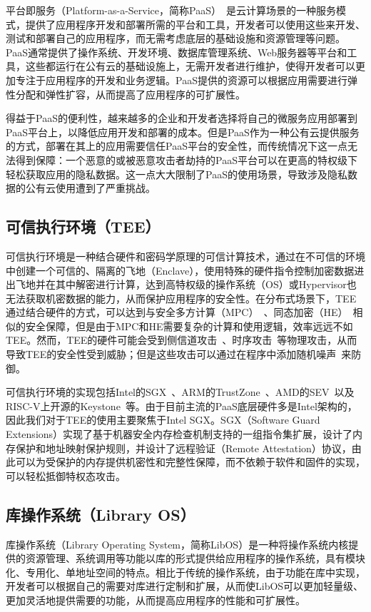 平台即服务（Platform-as-a-Service，简称PaaS）~\cite{}是云计算场景的一种服务模式，提供了应用程序开发和部署所需的平台和工具，开发者可以使用这些来开发、测试和部署自己的应用程序，而无需考虑底层的基础设施和资源管理等问题。PaaS通常提供了操作系统、开发环境、数据库管理系统、Web服务器等平台和工具，这些都运行在公有云的基础设施上，无需开发者进行维护，使得开发者可以更加专注于应用程序的开发和业务逻辑。PaaS提供的资源可以根据应用需要进行弹性分配和弹性扩容，从而提高了应用程序的可扩展性。

得益于PaaS的便利性，越来越多的企业和开发者选择将自己的微服务应用部署到PaaS平台上，以降低应用开发和部署的成本。但是PaaS作为一种公有云提供服务的方式，部署在其上的应用需要信任PaaS平台的安全性，而传统情况下这一点无法得到保障：一个恶意的或被恶意攻击者劫持的PaaS平台可以在更高的特权级下轻松获取应用的隐私数据。这一点大大限制了PaaS的使用场景，导致涉及隐私数据的公有云使用遭到了严重挑战。

\subsection{可信执行环境（TEE）}

可信执行环境是一种结合硬件和密码学原理的可信计算技术，通过在不可信的环境中创建一个可信的、隔离的飞地（Enclave），使用特殊的硬件指令控制加密数据进出飞地并在其中解密进行计算，达到高特权级的操作系统（OS）或Hypervisor也无法获取机密数据的能力，从而保护应用程序的安全性。在分布式场景下，TEE通过结合硬件的方式，可以达到与安全多方计算（MPC）~\cite{}、同态加密（HE）~\cite{}相似的安全保障，但是由于MPC和HE需要复杂的计算和使用逻辑，效率远远不如TEE。然而，TEE的硬件可能会受到侧信道攻击~\cite{}、时序攻击~\cite{}等物理攻击，从而导致TEE的安全性受到威胁；但是这些攻击可以通过在程序中添加随机噪声~\cite{}来防御。

可信执行环境的实现包括Intel的SGX~\cite{}、ARM的TrustZone~\cite{}、AMD的SEV~\cite{}以及RISC-V上开源的Keystone~\cite{}等。由于目前主流的PaaS底层硬件多是Intel架构的，因此我们对于TEE的使用主要聚焦于Intel SGX。SGX（Software Guard Extensions）实现了基于机器安全内存检查机制支持的一组指令集扩展，设计了内存保护和地址映射保护规则，并设计了远程验证（Remote Attestation）协议，由此可以为受保护的内存提供机密性和完整性保障，而不依赖于软件和固件的实现，可以轻松抵御特权态攻击。

\subsection{库操作系统（Library OS）}

库操作系统（Library Operating System，简称LibOS）是一种将操作系统内核提供的资源管理、系统调用等功能以库的形式提供给应用程序的操作系统，具有模块化、专用化、单地址空间的特点。相比于传统的操作系统，由于功能在库中实现，开发者可以根据自己的需要对库进行定制和扩展，从而使LibOS可以更加轻量级、更加灵活地提供需要的功能，从而提高应用程序的性能和可扩展性。

